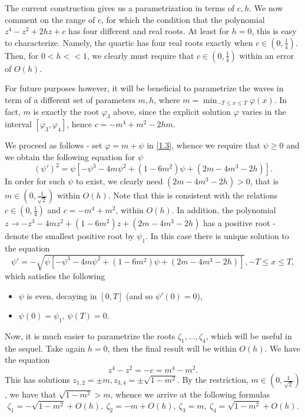 \documentclass[12pt]{amsart}
\theoremstyle{definition}
\theoremstyle{remark}
\numberwithin{equation}{section}
\renewcommand{\(}{\left(}
\renewcommand{\)}{\right)}
\renewcommand{\[}{\left[}
\renewcommand{\]}{\right]}
\newcommand{\f}[2]{\frac{#1}{#2}}
\newcommand{\vp}{\varphi}
\begin{document}
The current construction gives us a parametrization in terms of $c,h$. We now comment on the range of $c$, for which the condition that   the polynomial $z^4-z^2+2hz+c$ has four different and real roots. At least for $h=0$, this is easy to characterize. Namely, the quartic has four real roots exactly when  $c\in (0,\f{1}{4})$. Then, for $0<h<<1$, we clearly must require that
  $c\in (0, \f{1}{4})$ within an error of $O(h)$.

  For future purposes however, it will be beneficial to  parametrize the waves in term of a
  different set of parameters $m,h$, where $m=\min_{-T\leq x\leq T} \vp(x)$. In fact, $m$ is exactly the root $\vp_3$ above, since the explicit solution $\vp$ varies in the interval $[\vp_3, \vp_4]$, hence $c=-m^4+m^2-2hm$.

  We proceed as follows - set $\vp=m+\psi$ in \eqref{1.3}, whence we require that $\psi\geq 0$ and  we obtain the following equation for $\psi$
  \begin{equation}
  \label{1.33}
  (\psi')^2=\psi[-\psi^3-4m\psi^2+(1-6m^2) \psi+(2m-4m^3-2h)].
  \end{equation}
  In order for such $\psi$ to exist, we clearly need $(2m-4m^3-2h)>0$, that is $m\in (0, \f{1}{\sqrt{2}})$ within $O(h)$. Note that this is consistent with the relations $c\in (0,\f{1}{4})$ and $c=-m^4+m^2$, within $O(h)$. In addition, the polynomial $z\to -z^3-4m z^2+(1-6m^2) z+(2m-4m^3-2h)$ has a positive root -   denote the smallest positive root by $\psi_1$.
  In this case there is unique solution to the equation
  \begin{equation}
  \label{15}
  \psi'=-\sqrt{\psi[-\psi^3-4m\psi^2+(1-6m^2) \psi+(2m-4m^3-2h)]}, -T\leq x\leq T,
  \end{equation}
  which satisfies the following
  \begin{itemize}
  	\item $\psi$ is even, decaying in $[0,T]$ (and  so $\psi'(0)=0$),
  	\item $\psi(0)=\psi_1$, $\psi(T)=0$.
  \end{itemize}
  Now, it is much easier to parametrize the roots $\zeta_1, \ldots, \zeta_4$, which will be useful in the sequel. Take again $h=0$, then the final result will be within $O(h)$. We have the equation
  $$
  z^4-z^2=-c=m^4-m^2.
  $$
  This has solutions $z_{1,2}=\pm m, z_{3,4}=\pm \sqrt{1-m^2}$. By the restriction, $m\in (0, \f{1}{\sqrt{2}})$, we have that $\sqrt{1-m^2}>m$, whence we arrive at the following formulas
  \begin{equation}
  \label{20}
  \zeta_1=-\sqrt{1-m^2}+O(h),\  \zeta_2=-m+O(h),\  \zeta_3=m,\  \zeta_4=\sqrt{1-m^2}+O(h).
  \end{equation}
\end{document}
